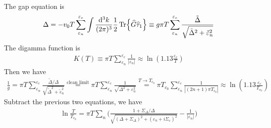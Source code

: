 \documentclass[]{article}
\begin{document}
The gap equation is
\begin{align}\label{eq:gap_eq}
    \Delta = -v_0 T\sum_{\varepsilon_n}^{\varepsilon_c}\int\frac{\dd[3]k}{(2\pi)^3}\frac{1}{2}\Tr{\widehat{G}\widehat{\tau}_1}
    \equiv g\pi T\sum_{\varepsilon_n}^{\varepsilon_c}\frac{\tilde{\Delta}}{\sqrt{\tilde{\Delta}^2 + \tilde{\varepsilon}_n^2}}
\end{align}
The digamma function is
\begin{align}\label{eq:digamma}
    K(T) \equiv \pi T \sum_{\varepsilon_n}^{\varepsilon_c}\frac{1}{|\varepsilon_n|} \approx \ln(1.13\frac{\varepsilon_c}{T})
\end{align}
Then we have
\begin{align}
    \frac{1}{g} = \pi T\sum_{\varepsilon_n}^{\varepsilon_c}
    \frac{\tilde{\Delta}/\Delta}{\sqrt{\tilde{\Delta}^2 + \tilde{\varepsilon}_n^2}}
    \overset{\text{clean limit}}{=} \pi T\sum_{\varepsilon_n}^{\varepsilon_c}
    \frac{1}{\sqrt{\Delta^2 + \varepsilon_n^2}}
    \overset{T\rightarrow T_{c_0}}{=}\pi T_{c_0}\sum_{\varepsilon_n}^{\varepsilon_c}\frac{1}{|(2n+1)\pi T_{c_0}|}
    \approx \ln(1.13\frac{\varepsilon_c}{T_{c_0}})
\end{align}
Subtract the previous two equations, we have
\begin{align}
    \ln\frac{T}{T_{c_0}} = \pi T\sum_n
    \Bigg(\frac{1 + \Sigma_\Delta/\Delta}{\sqrt{(\Delta + \Sigma_\Delta)^2 + (\varepsilon_n + i\Sigma_\varepsilon)^2}}
    - \frac{1}{|\varepsilon_n|}\Bigg)\label{eq:gap_eq_renormalized}
\end{align}
\end{document}
